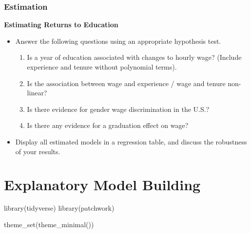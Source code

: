 \documentclass[
  letterpaper,
  DIV=11,
  numbers=noendperiod]{scrreprt}
\newenvironment{Shaded}{\begin{snugshade}}{\end{snugshade}}
\newcommand{\FunctionTok}[1]{\textcolor[rgb]{0.28,0.35,0.67}{#1}}
\newcommand{\NormalTok}[1]{\textcolor[rgb]{0.00,0.23,0.31}{#1}}
\providecommand{\tightlist}{%
  \setlength{\itemsep}{0pt}\setlength{\parskip}{0pt}}\usepackage{longtable,booktabs,array}
\begin{document}
\subsection{Estimation}\label{estimation}

\textbf{Estimating Returns to Education}

\begin{itemize}
\tightlist
\item
  Answer the following questions using an appropriate hypothesis test.

  \begin{enumerate}
  \def\labelenumi{\arabic{enumi}.}
  \tightlist
  \item
    Is a year of education associated with changes to hourly wage?
    (Include experience and tenure without polynomial terms).
  \item
    Is the association between wage and experience / wage and tenure
    non-linear?
  \item
    Is there evidence for gender wage discrimination in the U.S.?
  \item
    Is there any evidence for a graduation effect on wage?
  \end{enumerate}
\item
  Display all estimated models in a regression table, and discuss the
  robustness of your results.
\end{itemize}

\chapter{Explanatory Model Building}\label{explanatory-model-building}

\begin{Shaded}
\begin{Highlighting}[]
\FunctionTok{library}\NormalTok{(tidyverse)}
\FunctionTok{library}\NormalTok{(patchwork)}

\FunctionTok{theme\_set}\NormalTok{(}\FunctionTok{theme\_minimal}\NormalTok{())}
\end{Highlighting}
\end{Shaded}
\end{document}

